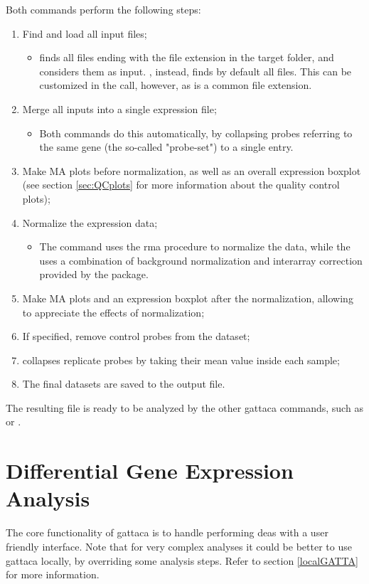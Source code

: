 Both commands perform the following steps:
\begin{enumerate}
    \item Find and load all input files;
    \begin{itemize}
        \item {} finds all files ending with the  file extension in the target folder, and considers them as input. , instead, finds by default all  files. This can be customized in the call, however, as  is a common file extension.
    \end{itemize}
    \item Merge all inputs into a single expression file;
    \begin{itemize}
        \item Both commands do this automatically, by collapsing probes referring to the same gene (the so-called "probe-set") to a single entry.
    \end{itemize}
    \item Make MA plots before normalization, as well as an overall expression boxplot  (see section \ref{sec:QCplots} for more information about the quality control plots);
    \item Normalize the expression data;
    \begin{itemize}
        \item The  command uses the \gls{rma} procedure to normalize the data, while the  uses a combination of background normalization and interarray correction provided by the  package.
    \end{itemize}
    \item Make MA plots and an expression boxplot after the normalization, allowing to appreciate the effects of normalization;
    \item If specified, remove control probes from the dataset;
    \item {} collapses replicate probes by taking their mean value inside each sample;
    \item The final datasets are saved to the output file.
\end{enumerate}

The resulting file is ready to be analyzed by the other \gls{gattaca} commands, such as  or .

\section{Differential Gene Expression Analysis}
The core functionality of \gls{gattaca} is to handle performing \glspl{dea} with a user friendly interface. Note that for very complex analyses it could be better to use \gls{gattaca} locally, by overriding some analysis steps. Refer to section \ref{localGATTA} for more information.

